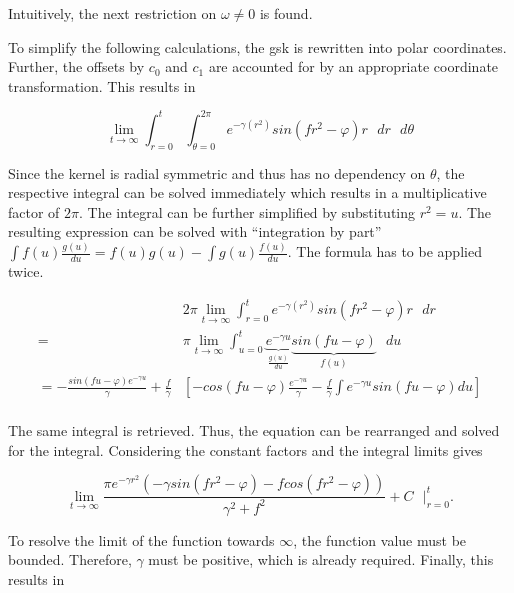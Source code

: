 \documentclass[./\jobname.tex]{subfiles}
\begin{document}
Intuitively, the next restriction on $\omega \neq 0$ is found. 

To simplify the following calculations, the \gls{gsk} is rewritten into polar coordinates. Further, the offsets by $c_0$ and $c_1$ are accounted for by an appropriate coordinate transformation. This results in 

\begin{equation}
\lim_{t \to \infty} \int_{r=0}^{t} \int_{\theta = 0}^{2 \pi} e^{-\gamma(r^2)} sin(f r^2 - \varphi) r \text{ } dr \text{ } d\theta
\end{equation}

Since the kernel is radial symmetric and thus has no dependency on $\theta$, the respective integral can be solved immediately which results in a multiplicative factor of $2 \pi$. The integral can be further simplified by substituting $r^2 = u$.
The resulting expression can be solved with ``integration by part'' $\int f(u) \frac{g(u)}{du} = f(u) g(u) - \int g(u) \frac{f(u)}{du}$. The formula has to be applied twice. 

\begin{equation}
\begin{split}
& 2 \pi \lim_{t \to \infty} \int_{r=0}^{t} e^{-\gamma(r^2)} sin(f r^2 - \varphi) r \text{ } dr  \\
= & \pi \lim_{t \to \infty} \int_{u=0}^{t} \underbrace{e^{-\gamma u }}_{\frac{g(u)}{du}} \underbrace{sin(f u - \varphi)}_{f(u)} \text{ } du \\
= - \frac{sin(fu - \varphi) e^{-\gamma u}}{\gamma} +\frac{f}{\gamma} & \left[ -cos(fu -\varphi) \frac{e^{-\gamma u}}{\gamma} -\frac{f}{\gamma} \int e^{-\gamma u} sin(fu -\varphi) du \right] \\
\end{split}
\end{equation}

The same integral is retrieved. Thus, the equation can be rearranged and solved for the integral. Considering the constant factors and the integral limits gives 

\begin{equation}
\lim_{t \to \infty} \frac{\pi e^{-\gamma r^2}(- \gamma sin(f r^2 - \varphi) - f cos(f r^2 - \varphi))}{ \gamma^2 + f^2} + C \text{ } \Bigg|_{r=0}^{t}.
\end{equation}

To resolve the limit of the function towards $\infty$, the function value must be bounded. Therefore, $\gamma$ must be positive, which is already required. Finally, this results in 
\end{document}
